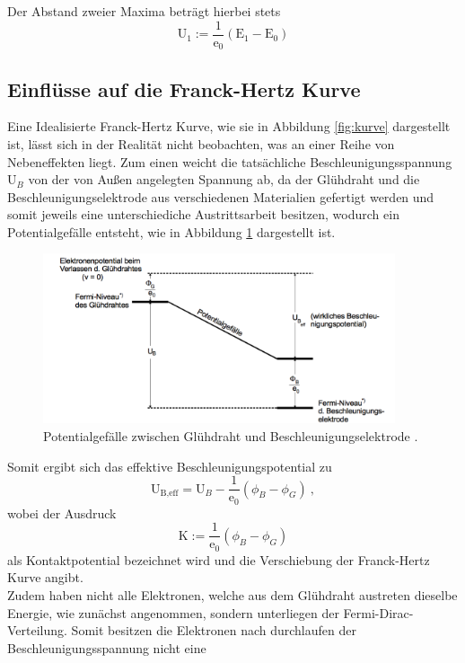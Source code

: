 Der Abstand zweier Maxima beträgt hierbei stets
\begin{equation}
  \text{U}_1 := \frac{1}{\text{e}_0} (\text{E}_1 - \text{E}_0)
\end{equation}

\subsection{Einflüsse auf die Franck-Hertz Kurve}
Eine Idealisierte Franck-Hertz Kurve, wie sie in Abbildung \ref{fig:kurve} dargestellt ist, lässt
sich in der Realität nicht beobachten, was an einer Reihe von Nebeneffekten liegt.
Zum einen weicht die tatsächliche Beschleunigungsspannung $\text{U}_B$ von der von Außen angelegten
Spannung ab, da der Glühdraht und die Beschleunigungselektrode aus verschiedenen Materialien gefertigt
werden und somit jeweils eine unterschiediche Austrittsarbeit besitzen, wodurch ein
Potentialgefälle entsteht, wie in Abbildung \ref{fig:kontakt} dargestellt ist.
\begin{figure}[H]
  \centering
  \includegraphics[height=5cm]{Kontakt.png}
  \caption{Potentialgefälle zwischen Glühdraht und Beschleunigungselektrode \cite{skript}.}
  \label{fig:kontakt}
\end{figure}
Somit ergibt sich das effektive Beschleunigungspotential zu
\begin{equation}
  \text{U}_{\text{B,eff}} = \text{U}_B - \frac{1}{\text{e}_0}(\phi_B - \phi_G) \: ,
  \label{eqn:ueff}
\end{equation}
wobei der Ausdruck
\begin{equation}
  \text{K} := \frac{1}{\text{e}_0}(\phi_B - \phi_G)
  \label{eqn:kontaktpotential}
\end{equation}
als Kontaktpotential bezeichnet wird und die Verschiebung der Franck-Hertz Kurve
angibt.\\
Zudem haben nicht alle Elektronen, welche aus dem Glühdraht austreten dieselbe
Energie, wie zunächst angenommen, sondern unterliegen der Fermi-Dirac-Verteilung.
Somit besitzen die Elektronen nach durchlaufen der Beschleunigungsspannung nicht eine
